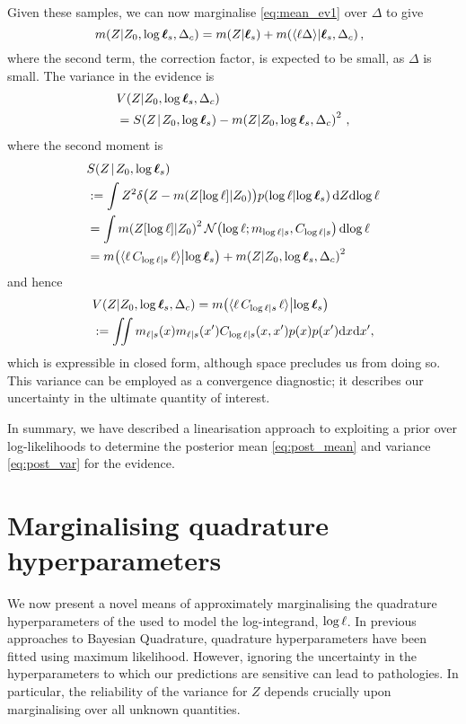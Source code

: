 \documentclass{article}
\begin{document}
Given these samples, we can now marginalise \eqref{eq:mean_ev1} over $\Delta$ to give
\begin{equation} \label{eq:post_mean}
 \hspace{-0.2cm}\mean{\If}{Z_0,\tvr_s,\Delta_c} =
\mean{\If}{\vr_s} + \mean{\inty{\lfn \Delta}}{\vr_s, \Delta_c},
\end{equation}
where the second term, the correction factor, is expected to be small, as $\Delta$ is small. The variance in the evidence is
\begin{align} 
& \cov{\If}{Z_0,\tvr_s,\Delta_c}\nonumber\\ 
& = \secm{\If}{Z_0,\tvr_s} - \mean{\If}{Z_0,\tvr_s,\Delta_c}^2\,,
\end{align}
where the second moment is 
\begin{align}
& \secm{\If}{Z_0,\tvr_s}  \nonumber\\
& \deq \int Z^2 
\delta\bigl(Z - \mean{Z[\tr]}{Z_0}\bigr)
\p{\tr}{\tvr_s}
\ud Z \ud\tr
\nonumber\\
& = \int \mean{Z[\tr]}{Z_0}^2
\N{\tr}{\meancondfn{\tr}{s}}{C_{\tr|s}}
 \ud\tr
\nonumber\\
& = \mean{\inty{\lfn\,C_{\tr|s}\,\lfn}}{\tvr_s}+
\mean{\If}{Z_0,\tvr_s,\Delta_c}^2
\end{align}
and hence 
\begin{align} \label{eq:post_var}
  &\cov{\If}{Z_0,\tvr_s,\Delta_c} = \mean{\inty{\lfn\,C_{\tr|s}\,\lfn}}{\tvr_s} 
\nonumber\\ 
&\deq
 \iint m_{\lfn|s}(\lfv) m_{\lfn|s}(\lfv') C_{\tr|s}(\lfv,\lfv')  p(x) p(x') \ud \lfv \ud\lfv',
\end{align}
which is expressible in closed form, although space precludes us from doing so. This variance can be employed as a convergence diagnostic; it describes our uncertainty in the ultimate quantity of interest.

In summary, we have described a linearisation approach to exploiting a  prior over log-likelihoods to determine the posterior mean \eqref{eq:post_mean} and variance \eqref{eq:post_var} for the evidence. 

\section{Marginalising quadrature hyperparameters}
\label{sec:marginalizing}

We now present a novel means of approximately marginalising the quadrature hyperparameters of the \gpb used to model the log-integrand, $\tr$. In previous approaches to Bayesian Quadrature, quadrature hyperparameters have been fitted using 
 maximum likelihood. However, ignoring the uncertainty in the hyperparameters to which our predictions are sensitive can lead to pathologies. In particular, the reliability of the variance for $Z$ depends crucially upon marginalising over all unknown quantities. 
\end{document}
